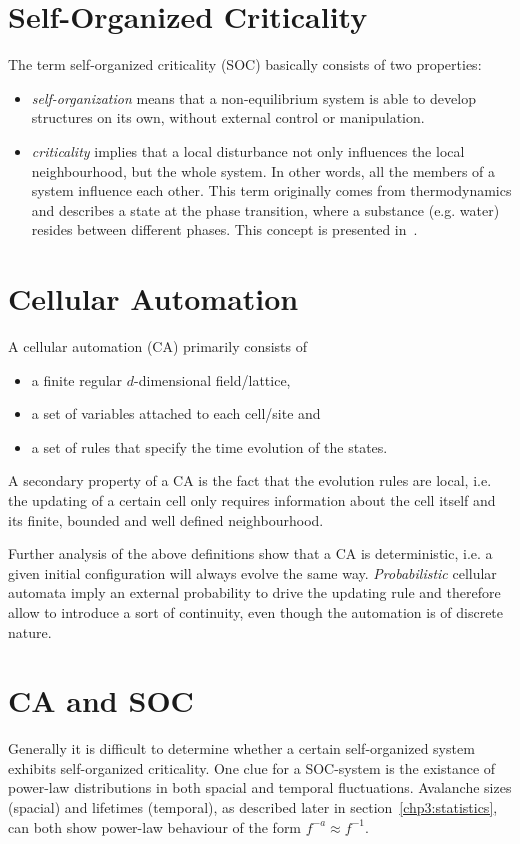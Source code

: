 \section{Self-Organized Criticality}
The term self-organized criticality (SOC) basically consists of two properties:
\begin{itemize}
\item \emph{self-organization} means that a non-equilibrium system is able to develop structures on its own, without external control or manipulation.
\item \emph{criticality} implies that a local disturbance not only influences the local neighbourhood, but the whole system. In other words, all the members of a system influence each other. This term originally comes from thermodynamics and describes a state at the phase transition, where a substance (e.g. water) resides between different phases. This concept is presented in~\cite{1overf}.
\end{itemize}

\section{Cellular Automation}
A cellular automation (CA) primarily consists of
\begin{itemize}
\item a finite regular $d$-dimensional field/lattice,
\item a set of variables attached to each cell/site and
\item a set of rules that specify the time evolution of the states.
\end{itemize}
A secondary property of a CA is the fact that the evolution rules are local, i.e. the updating of a certain cell only requires information about the cell itself and its finite, bounded and well defined neighbourhood.

Further analysis of the above definitions show that a CA is deterministic, i.e. a given initial configuration will always evolve the same way. \emph{Probabilistic} cellular automata imply an external probability to drive the updating rule and therefore allow to introduce a sort of continuity, even though the automation is of discrete nature.

\section{CA and SOC}\label{sec:CAandSOC}
Generally it is difficult to determine whether a certain self-organized system exhibits self-organized criticality. One clue for a SOC-system is the existance of power-law distributions in both spacial and temporal fluctuations. Avalanche sizes (spacial) and lifetimes (temporal), as described later in section~\ref{chp3:statistics}, can both show power-law behaviour of the form $f^{-a} \approx f^{-1}$.

